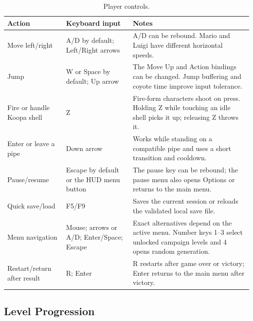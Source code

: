 \documentclass{template}
\begin{document}
\begin{table}[H]
    \centering
    \caption{Player controls.}
    \label{tab:controls}
    \begin{tabularx}{\textwidth}{@{}p{3.4cm}p{4.4cm}X@{}}
        \toprule
        \textbf{Action} & \textbf{Keyboard input} &
        \textbf{Notes} \\
        \midrule
        Move left/right & A/D by default; Left/Right arrows & A/D can be
        rebound. Mario and Luigi have different horizontal speeds. \\
        Jump & W or Space by default; Up arrow & The Move Up and Action
        bindings can be changed. Jump buffering and coyote time improve input
        tolerance. \\
        Fire or handle Koopa shell & Z & Fire-form characters shoot on press.
        Holding Z while touching an idle shell picks it up; releasing Z throws
        it. \\
        Enter or leave a pipe & Down arrow & Works while standing on a
        compatible pipe and uses a short transition and cooldown. \\
        Pause/resume & Escape by default or the HUD menu button & The pause key
        can be rebound; the pause menu also opens Options or returns to the main
        menu. \\
        Quick save/load & F5/F9 & Saves the current session or reloads the
        validated local save file. \\
        Menu navigation & Mouse; arrows or A/D; Enter/Space; Escape & Exact
        alternatives depend on the active menu. Number keys 1--3 select unlocked
        campaign levels and 4 opens random generation. \\
        Restart/return after result & R; Enter & R restarts after game over or
        victory; Enter returns to the main menu after victory. \\
        \bottomrule
    \end{tabularx}
\end{table}

\subsection{Level Progression}
\end{document}

